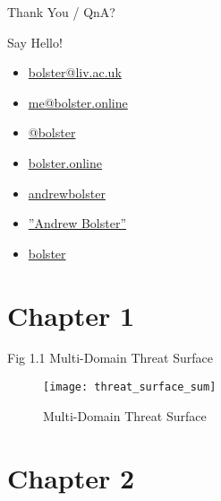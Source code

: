 \documentclass[aspectratio=169]{beamer}
\begin{document}
\begin{frame}{\alert{Thank You / QnA?}}
          \begin{center}
          	\begin{minipage}{4cm}
\begin{exampleblock}{Say Hello!}
	\begin{itemize}
		\item[\faEnvelope] \href{mailto:bolster@liv.ac.uk}{bolster@liv.ac.uk}
		\item[\faEnvelope] \href{mailto:me@bolster.online}{me@bolster.online}
		\item[\faTwitter] \href{https://twitter.com/bolster}{@bolster}
		\item[\faSitemap] \href{http://bolster.online}{bolster.online}
		\item[\faGithub] \href{https://github.com/andrewbolster}{andrewbolster}
		\item[\faLinkedin] \href{http://www.linkedin.com/in/andrewbolster}{''Andrew Bolster''}
		\item[\faStackOverflow] \href{http://www.stackoverflow.com/users/252556/bolster}{bolster}
	\end{itemize}
\end{exampleblock}
\end{minipage}
\end{center}
\end{frame}

\appendix

\section{Chapter 1}

\begin{frame}{Fig 1.1 Multi-Domain Threat Surface}
	\begin{figure}[h!]
		\centering
		\texttt{[image: threat\_surface\_sum]}
		\caption[Multi-Domain Threat Surface]{Multi-Domain Threat Surface}
		\label{fig:threat_surface}
	\end{figure}
\end{frame}

\section{Chapter 2}
\end{document}
